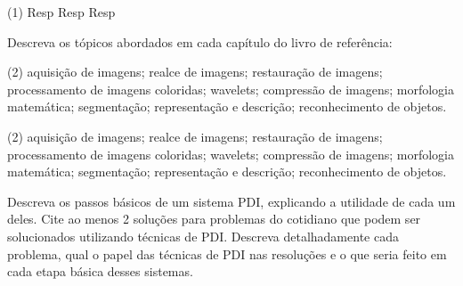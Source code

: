 \documentclass[12pt,a4paper]{article}
\begin{document}
\begin{solution}
    \begin{tasks}(1)
        \task Resp
        \task Resp 
        \task Resp
    \end{tasks}
\end{solution}


\begin{question}{1}
    Descreva os tópicos abordados em cada capítulo do livro de referência:
    \begin{tasks}(2)
        \task aquisição de imagens;
        \task realce de imagens;
        \task restauração de imagens;
        \task processamento de imagens coloridas;
        \task wavelets;
        \task compressão de imagens;
        \task morfologia matemática;
        \task segmentação;
        \task representação e descrição;
        \task reconhecimento de objetos.
    \end{tasks}
\end{question}

\begin{solution}
    \begin{tasks}(2)
        \task aquisição de imagens;
        \task realce de imagens;
        \task restauração de imagens;
        \task processamento de imagens coloridas;
        \task wavelets;
        \task compressão de imagens;
        \task morfologia matemática;
        \task segmentação;
        \task representação e descrição;
        \task reconhecimento de objetos.
    \end{tasks}
\end{solution}



\begin{question}{1}
Descreva os passos básicos de um sistema PDI, explicando a utilidade de cada um
deles. Cite ao menos 2 soluções para problemas do cotidiano que podem ser
solucionados utilizando técnicas de PDI. Descreva detalhadamente cada problema,
qual o papel das técnicas de PDI nas resoluções e o que seria feito em cada
etapa básica desses sistemas.
\end{question}


\pagebreak
\medskip
\printbibliography[
    heading=bibintoc,
    title={Referências Bibliográficas}
]
\end{document}
